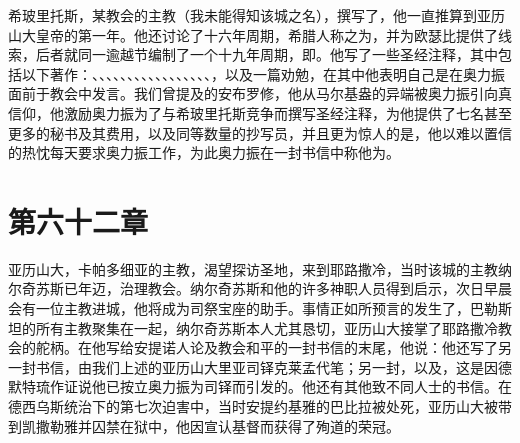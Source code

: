 希玻里托斯，某教会的主教（我未能得知该城之名），撰写了，他一直推算到亚历山大皇帝的第一年。他还讨论了十六年周期，希腊人称之为，并为欧瑟比提供了线索，后者就同一逾越节编制了一个十九年周期，即。他写了一些圣经注释，其中包括以下著作：、、、、、、、、、、、、、、、、、，以及一篇劝勉，在其中他表明自己是在奥力振面前于教会中发言。我们曾提及的安布罗修，他从马尔基盎的异端被奥力振引向真信仰，他激励奥力振为了与希玻里托斯竞争而撰写圣经注释，为他提供了七名甚至更多的秘书及其费用，以及同等数量的抄写员，并且更为惊人的是，他以难以置信的热忱每天要求奥力振工作，为此奥力振在一封书信中称他为。\par


\section{第六十二章}

亚历山大，卡帕多细亚的主教，渴望探访圣地，来到耶路撒冷，当时该城的主教纳尔奇苏斯已年迈，治理教会。纳尔奇苏斯和他的许多神职人员得到启示，次日早晨会有一位主教进城，他将成为司祭宝座的助手。事情正如所预言的发生了，巴勒斯坦的所有主教聚集在一起，纳尔奇苏斯本人尤其恳切，亚历山大接掌了耶路撒冷教会的舵柄。在他写给安提诺人论及教会和平的一封书信的末尾，他说：他还写了另一封书信，由我们上述的亚历山大里亚司铎克莱孟代笔；另一封，以及，这是因德默特琉作证说他已按立奥力振为司铎而引发的。他还有其他致不同人士的书信。在德西乌斯统治下的第七次迫害中，当时安提约基雅的巴比拉被处死，亚历山大被带到凯撒勒雅并囚禁在狱中，他因宣认基督而获得了殉道的荣冠。\par


